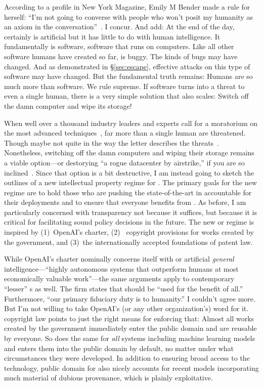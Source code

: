 According to a profile in New York Magazine, Emily M Bender made a rule for
herself: ``I'm not going to converse with people who won't posit my humanity as
an axiom in the conversation''~\cite{Weil2023}. I concur. And add: At the end of
the day,  certainly is artificial but it has little to do with human
intelligence. It fundamentally is software, software that runs on computers.
Like all other software humans have created so far,  is buggy. The kinds of
bugs may have changed. And as demonstrated in \S\ref{sec:escape}, effective
attacks on this type of software may have changed. But the fundamental truth
remains: Humans are so much more than software. We rule supreme. If software
turns into a threat to even a single human, there is a very simple solution that
also scales: Switch off the damn computer and wipe its storage!

When well over a thousand industry leaders and experts call for a moratorium on
the most advanced  techniques~\cite{MetzSchmidt2023}, far more than a single
human are threatened. Though maybe not quite in the way the letter describes the
threats~\cite{KapoorNarayanan2023}. Nonetheless, switching off the damn
computers and wiping their storage remains a viable option---or destorying ``a
rogue datacenter by airstrike,'' if you are so inclined~\cite{Yudkowsky2023}.
Since that option is a bit destructive, I am instead going to sketch the
outlines of a new intellectual property regime for . The primary goals for
the new  regime are to hold those who are pushing the state-of-the-art in
 accountable for their deployments and to ensure that everyone benefits from
. As before, I am particularly concerned with transparency not because it
suffices, but because it is critical for facilitating sound policy decisions in
the future. The new   or  regime is inspired by (1)~OpenAI's
charter, (2)~ copyright provisions for works created by the government, and
(3)~the internationally accepted foundations of patent law.

While OpenAI's charter nominally concerns itself with  or artificial
\emph{general} intelligence---``highly autonomous systems that outperform humans
at most economically valuable work''---the same arguments apply to contemporary
``lesser'' s as well. The firm states that  should be ``used for the
benefit of all.'' Furthermore, ``our primary fiduciary duty is to humanity.'' I
couldn't agree more. But I'm not willing to take OpenAI's (or any other
organization's) word for it.  copyright law points to just the right means
for enforcing that: Almost all works created by the government immediately enter
the public domain and are reusable by everyone. So  does the same for
\emph{all}  systems including machine learning models and enters them into
the public domain by default, no matter under what circumstances they were
developed. In addition to ensuring broad access to the technology, public domain
for  also nicely accounts for recent models incorporating much material of
dubious provenance, which is plainly exploitative.

